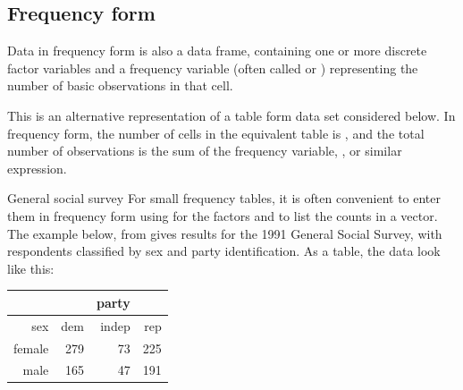 \documentclass[11pt]{book}
\begin{document}
\subsection{Frequency form}
Data in frequency form is also a data frame, containing
one or more discrete factor variables and a frequency variable
(often called  or )
representing the number of basic observations in that cell.

This is an alternative representation of a table form data set considered
below.
In frequency form, the number of cells in the equivalent table
is , and the total number of observations
is the sum of the frequency variable, ,
  or similar expression.

\begin{Example}[ch2-GSS]{General social survey} 
For small frequency tables, it is often convenient to enter them in frequency form
using  for the factors and  to list the counts in a vector.
The example below, from \cite{Agresti:2002} gives results for the 1991 General Social Survey,
with respondents classified by sex and party identification.
As a table, the data look like this:
\begin{center}
\begin{tabular}{rrrr}
  \hline
    &     & party & \\
  \hline
sex & dem & indep & rep \\ 
  \hline
female & 279 & 73 & 225 \\ 
  male & 165 & 47 & 191 \\ 
   \hline
\end{tabular}
\end{center}



\end{Example}
\end{document}
